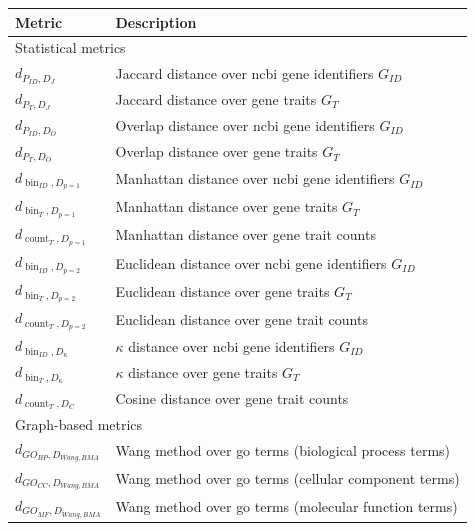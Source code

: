\documentclass{thesisclass}
\DeclareMathOperator{\bin}{bin}
\DeclareMathOperator{\countOp}{count}
\begin{document}
\begin{table}[!h]
	\centering
	\begin{tabularx}{\linewidth}{l|X}
		\hline
		Metric & Description \\
		\hline
		\multicolumn{2}{l}{Statistical metrics} \\
		\hline
		$\displaystyle d_{P_{ID}, D_J}$ & Jaccard distance over \acrshort{ncbi} gene identifiers $G_{ID}$\\
		$\displaystyle d_{P_{T}, D_J}$ & Jaccard distance over gene traits $G_T$ \\
		$\displaystyle d_{P_{ID}, D_O}$ & Overlap distance over \acrshort{ncbi} gene identifiers $G_{ID}$\\
		$\displaystyle d_{P_{T}, D_O}$ & Overlap distance over gene traits $G_T$ \\
		\hline
	    $\displaystyle d_{\bin_{ID}, D_{p=1}}$ & Manhattan distance over \acrshort{ncbi} gene identifiers $G_{ID}$ \\
	    $\displaystyle d_{\bin_{T}, D_{p=1}}$ & Manhattan distance over gene traits $G_T$ \\
		$\displaystyle d_{\countOp_{T}, D_{p=1}}$ & Manhattan distance over gene trait counts \\
		$\displaystyle d_{\bin_{ID}, D_{p=2}}$ & Euclidean distance over \acrshort{ncbi} gene identifiers  $G_{ID}$\\
		$\displaystyle d_{\bin_{T}, D_{p=2}}$ & Euclidean distance over gene traits $G_T$ \\
		$\displaystyle d_{\countOp_{T}, D_{p=2}}$ & Euclidean distance over gene trait counts \\
		$\displaystyle d_{\bin_{ID}, D_\kappa}$ & $\kappa$ distance over \acrshort{ncbi} gene identifiers $G_{ID}$\\
		$\displaystyle d_{\bin_{T}, D_\kappa}$ & $\kappa$ distance over gene traits $G_T$ \\
		$\displaystyle d_{\countOp_{T}, D_C}$ & Cosine distance over gene trait counts \\
		\hline
		\multicolumn{2}{l}{Graph-based metrics} \\
		\hline
		$\displaystyle d_{GO_{BP}, D_{Wang,BMA}}$ & Wang method over \acrshort{go} terms (biological process terms) \\
		$\displaystyle d_{GO_{CC}, D_{Wang,BMA}}$ & Wang method over \acrshort{go} terms (cellular component terms) \\
		$\displaystyle d_{GO_{MF}, D_{Wang,BMA}}$ & Wang method over \acrshort{go} terms (molecular function terms) \\

\end{tabularx}
\end{table}
\end{document}
